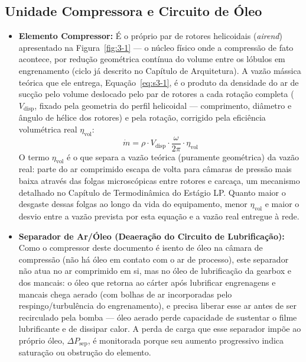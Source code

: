 \documentclass[12pt,a4paper]{article}
\numberwithin{equation}{section}
\numberwithin{table}{section}
\numberwithin{figure}{section}
\begin{document}
	\subsection{\textbf{Unidade Compressora e Circuito de Óleo}}
	\begin{itemize}
		\item \textbf{Elemento Compressor:} É o próprio par de rotores helicoidais (\textit{airend}) apresentado na Figura~\ref{fig:3-1} — o núcleo físico onde a compressão de fato acontece, por redução geométrica contínua do volume entre os lóbulos em engrenamento (ciclo já descrito no Capítulo de Arquitetura). A vazão mássica teórica que ele entrega, Equação~\eqref{eq:s3-1}, é o produto da densidade do ar de sucção pelo volume deslocado pelo par de rotores a cada rotação completa ($V_{\text{disp}}$, fixado pela geometria do perfil helicoidal — comprimento, diâmetro e ângulo de hélice dos rotores) e pela rotação, corrigido pela eficiência volumétrica real $\eta_{\text{vol}}$:
		\begin{equation}\label{eq:s3-1}
 \dot{m} = \rho \cdot V_{\text{disp}} \cdot \frac{\omega}{2\pi} \cdot \eta_{\text{vol}}
\end{equation}
		O termo $\eta_{\text{vol}}$ é o que separa a vazão teórica (puramente geométrica) da vazão real: parte do ar comprimido escapa de volta para câmaras de pressão mais baixa através das folgas microscópicas entre rotores e carcaça, um mecanismo detalhado no Capítulo de Termodinâmica do Estágio LP. Quanto maior o desgaste dessas folgas ao longo da vida do equipamento, menor $\eta_{\text{vol}}$ e maior o desvio entre a vazão prevista por esta equação e a vazão real entregue à rede.
		\item \textbf{Separador de Ar/Óleo (Deaeração do Circuito de Lubrificação):} Como o compressor deste documento é isento de óleo na câmara de compressão (não há óleo em contato com o ar de processo), este separador não atua no ar comprimido em si, mas no óleo de lubrificação da gearbox e dos mancais: o óleo que retorna ao cárter após lubrificar engrenagens e mancais chega aerado (com bolhas de ar incorporadas pelo respingo/turbulência do engrenamento), e precisa liberar esse ar antes de ser recirculado pela bomba — óleo aerado perde capacidade de sustentar o filme lubrificante e de dissipar calor. A perda de carga que esse separador impõe ao próprio óleo, $\Delta P_{\text{sep}}$, é monitorada porque seu aumento progressivo indica saturação ou obstrução do elemento.
	\end{itemize}
	
\end{document}
